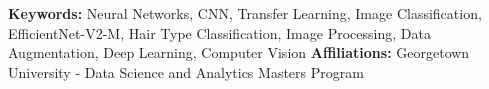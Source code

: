 \vspace{1em}
\noindent\textbf{Keywords:}  Neural Networks, CNN, Transfer Learning, Image Classification, EfficientNet-V2-M, Hair Type Classification, Image Processing, Data Augmentation, Deep Learning, Computer Vision
\hfill
\break
\noindent\textbf{Affiliations:} Georgetown University - Data Science and Analytics Masters Program
\newpage